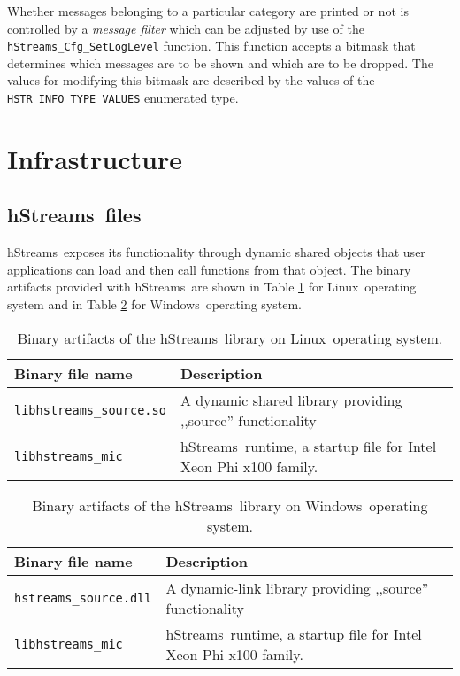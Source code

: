 \documentclass[a4,oneside]{book}
\newcommand{\kncixp}{Intel\textregistered{} Xeon Phi\texttrademark{} x100 family}
\newcommand{\hstreams}{hStreams}
\newcommand{\windows}{Windows}
\newcommand{\linux}{Linux}
\begin{document}
Whether messages belonging to a particular category are printed or not is controlled by a \emph{message filter} which can be adjusted by use of the \texttt{hStreams\_Cfg\_SetLogLevel} function.
This function accepts a bitmask that determines which messages are to be shown and which are to be dropped.
The values for modifying this bitmask are described by the values of the \texttt{HSTR\_INFO\_TYPE\_VALUES} enumerated type.


\section{Infrastructure}
\subsection{\hstreams\ files}
\hstreams\ exposes its functionality through dynamic shared objects that user applications can load and then call functions from that object. The binary artifacts provided with \hstreams\ are shown in Table \ref{tab:hstreams-binaries-linux} for \linux\ operating system and in Table \ref{tab:hstreams-binaries-windows} for \windows\ operating system.
\begin{table}[h]
\begin{tabularx}{\textwidth}{ l X }\hline
  Binary file name & Description \\ \hline
  \texttt{libhstreams\_source.so} & A dynamic shared library providing ,,source'' functionality \\ \hline
  \texttt{libhstreams\_mic} & \hstreams\ runtime, a startup file for \kncixp.\\ \hline
\end{tabularx}
\caption{Binary artifacts of the \hstreams\ library on \linux\ operating system.}
\label{tab:hstreams-binaries-linux}
\end{table}

\begin{table}[h]
\begin{tabularx}{\textwidth}{ l X }\hline
  Binary file name & Description \\ \hline
  \texttt{hstreams\_source.dll} & A dynamic-link library providing ,,source'' functionality \\ \hline
  \texttt{libhstreams\_mic} & \hstreams\ runtime, a startup file for \kncixp.\\ \hline
\end{tabularx}
\caption{Binary artifacts of the \hstreams\ library on \windows\ operating system.}
\label{tab:hstreams-binaries-windows}
\end{table}
\end{document}
